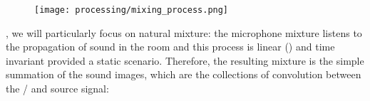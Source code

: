 \begin{figure}[t]
    \begin{fullwidthfig}
        \texttt{[image: processing/mixing\_process.png]}
    \end{fullwidthfig}

    \vspace{-\baselineskip}\vspace{-\baselineskip}
    \label{fig:processing:mixing}
\end{figure}

, we will particularly focus on natural mixture:
the microphone mixture listens to the propagation of sound in the room and this process is linear () and time invariant provided a static scenario.
Therefore, the resulting mixture is the simple summation of the sound images,
which are the collections of convolution between the \RIRs/ and source signal:
